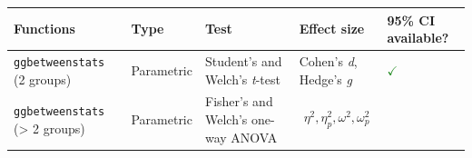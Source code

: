 \documentclass[]{article}
\begin{document}
\begin{longtable}[]{@{}lllll@{}}
\toprule
\begin{minipage}[b]{0.20\columnwidth}\raggedright
Functions\strut
\end{minipage} & \begin{minipage}[b]{0.16\columnwidth}\raggedright
Type\strut
\end{minipage} & \begin{minipage}[b]{0.31\columnwidth}\raggedright
Test\strut
\end{minipage} & \begin{minipage}[b]{0.12\columnwidth}\raggedright
Effect size\strut
\end{minipage} & \begin{minipage}[b]{0.07\columnwidth}\raggedright
95\% CI available?\strut
\end{minipage}\tabularnewline
\midrule
\endhead
\begin{minipage}[t]{0.20\columnwidth}\raggedright
\texttt{ggbetweenstats} (2 groups)\strut
\end{minipage} & \begin{minipage}[t]{0.16\columnwidth}\raggedright
Parametric\strut
\end{minipage} & \begin{minipage}[t]{0.31\columnwidth}\raggedright
Student's and Welch's \emph{t}-test\strut
\end{minipage} & \begin{minipage}[t]{0.12\columnwidth}\raggedright
Cohen's \emph{d}, Hedge's \emph{g}\strut
\end{minipage} & \begin{minipage}[t]{0.07\columnwidth}\raggedright
\textcolor{ForestGreen}{$\checkmark$}\strut
\end{minipage}\tabularnewline
\begin{minipage}[t]{0.20\columnwidth}\raggedright
\texttt{ggbetweenstats} (\textgreater{} 2 groups)\strut
\end{minipage} & \begin{minipage}[t]{0.16\columnwidth}\raggedright
Parametric\strut
\end{minipage} & \begin{minipage}[t]{0.31\columnwidth}\raggedright
Fisher's and Welch's one-way ANOVA\strut
\end{minipage} & \begin{minipage}[t]{0.12\columnwidth}\raggedright
\[\eta^2, \eta^2_p, \omega^2, \omega^2_p\]\strut
\end{minipage} & \begin{minipage}[t]{0.07\columnwidth}\raggedright

\end{minipage}
\end{longtable}
\end{document}
